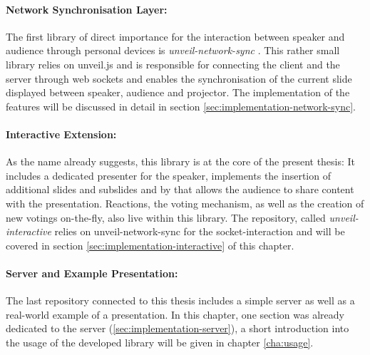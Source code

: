 \paragraph{Network Synchronisation Layer:} The first library of direct importance for the interaction between speaker and audience through personal devices is \textit{unveil-network-sync} \cite{unveil-network-sync}. This rather small library relies on unveil.js and is responsible for connecting the client and the server through web sockets and enables the synchronisation of the current slide displayed between speaker, audience and projector. The implementation of the features will be discussed in detail in section \ref{sec:implementation-network-sync}.

\paragraph{Interactive Extension:} As the name already suggests, this library is at the core of the present thesis: It includes a dedicated presenter for the speaker, implements the insertion of additional slides and subslides and by that allows the audience to share content with the presentation. Reactions, the voting mechanism, as well as the creation of new votings on-the-fly, also live within this library. The repository, called \emph{unveil-interactive} \cite{unveil-interactive} relies on unveil-network-sync for the socket-interaction and will be covered in section \ref{sec:implementation-interactive} of this chapter.

\paragraph{Server and Example Presentation:} The last repository connected to this thesis \cite{unveil-client-server} includes a simple server as well as a real-world example of a presentation. In this chapter, one section was already dedicated to the server (\ref{sec:implementation-server}), a short introduction into the usage of the developed library will be given in chapter \ref{cha:usage}.

